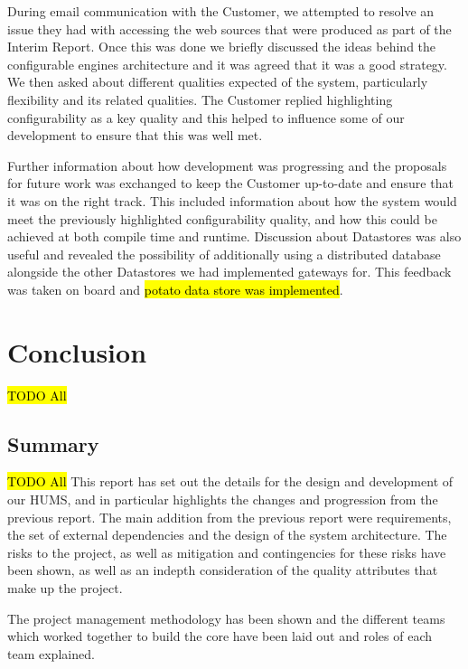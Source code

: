\documentclass[10pt,a4paper]{article}
\begin{document}
During email communication with the Customer, we attempted to resolve an issue they had with accessing the web sources that were produced as part of the Interim Report. Once this was done we briefly discussed the ideas behind the configurable engines architecture and it was agreed that it was a good strategy. We then asked about different qualities expected of the system, particularly flexibility and its related qualities. The Customer replied highlighting configurability as a key quality and this helped to influence some of our development to ensure that this was well met.

Further information about how development was progressing and the proposals for future work was exchanged to keep the Customer up-to-date and ensure that it was on the right track. This included information about how the system would meet the previously highlighted configurability quality, and how this could be achieved at both compile time and runtime. Discussion about Datastores was also useful and revealed the possibility of additionally using a distributed database alongside the other Datastores we had implemented gateways for. This feedback was taken on board and \hl{potato data store was implemented}.


\section{Conclusion}
\label{sec:conclusion}
\hl{TODO All}

\subsection{Summary}
\label{sec:summary}
\hl{TODO All}
This report has set out the details for the design and development of our HUMS, and in particular highlights the changes and progression from the previous report. The main addition from the previous report were requirements, the set of external dependencies and the design of the system architecture. The risks to the project, as well as mitigation and contingencies for these risks have been shown, as well as an indepth consideration of the quality attributes that make up the project.

The project management methodology has been shown and the different teams which worked together to build the core have been laid out and roles of each team explained.
\end{document}
